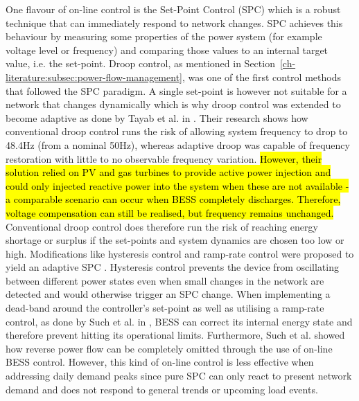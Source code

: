 One flavour of on-line control is the Set-Point Control (SPC) which is a robust technique that can immediately respond to network changes.
SPC achieves this behaviour by measuring some properties of the power system (for example voltage level or frequency) and comparing those values to an internal target value, i.e. the set-point.
Droop control, as mentioned in Section~\ref{ch-literature:subsec:power-flow-management}, was one of the first control methods that followed the SPC paradigm.
A single set-point is however not suitable for a network that changes dynamically which is why droop control was extended to become adaptive as done by Tayab et al. in \cite{Tayab2017}.
Their research shows how conventional droop control runs the risk of allowing system frequency to drop to 48.4Hz (from a nominal 50Hz), whereas adaptive droop was capable of frequency restoration with little to no observable frequency variation.
\hl{However, their solution relied on PV and gas turbines to provide active power injection and could only injected reactive power into the system when these are not available - a comparable scenario can occur when BESS completely discharges.
Therefore, voltage compensation can still be realised, but frequency remains unchanged.}
Conventional droop control does therefore run the risk of reaching energy shortage or surplus if the set-points and system dynamics are chosen too low or high.
Modifications like hysteresis control and ramp-rate control were proposed to yield an adaptive SPC \cite{Blaabjerg2006, Malesani1990, Xu2011a, Such2012}.
Hysteresis control prevents the device from oscillating between different power states even when small changes in the network are detected and would otherwise trigger an SPC change.
When implementing a dead-band around the controller's set-point as well as utilising a ramp-rate control, as done by Such et al. in \cite{Such2012}, BESS can correct its internal energy state and therefore prevent hitting its operational limits.
Furthermore, Such et al. showed how reverse power flow can be completely omitted through the use of on-line BESS control.
However, this kind of on-line control is less effective when addressing daily demand peaks since pure SPC can only react to present network demand and does not respond to general trends or upcoming load events.

